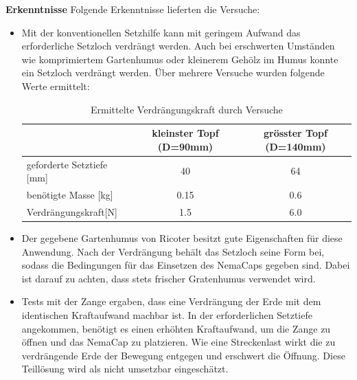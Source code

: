 \textbf{Erkenntnisse}
\newline
Folgende Erkenntnisse lieferten die Versuche:
\begin{itemize}
	\item Mit der konventionellen Setzhilfe kann mit geringem Aufwand das erforderliche Setzloch verdrängt werden. Auch bei erschwerten Umständen wie komprimiertem Gartenhumus oder kleinerem Gehölz im Humus konnte ein Setzloch verdrängt werden. Über mehrere Versuche wurden folgende Werte ermittelt:
\begin{table}[H]
	\begin{tabular}{|l|c|c|}
		\hline 
		& kleinster Topf (D=90mm) & grösster Topf (D=140mm) \\ 
		\hline 
		geforderte Setztiefe [mm] & 40 & 64 \\ 
		\hline 
		benötigte Masse [kg] & 0.15 & 0.6 \\ 
		\hline 
		Verdrängungskraft[N] & 1.5  & 6.0  \\ 
		\hline 
	\end{tabular} 
	\caption{Ermittelte Verdrängungskraft durch Versuche}
	\label{tab:verdraengungskraft}
\end{table}	
	
	\item Der gegebene Gartenhumus von Ricoter besitzt gute Eigenschaften für diese Anwendung. Nach der Verdrängung behält das Setzloch seine Form bei, sodass die Bedingungen für das Einsetzen des NemaCaps gegeben sind. Dabei ist darauf zu achten, dass stets frischer Gratenhumus verwendet wird.
	
	\item Tests mit der Zange ergaben, dass eine Verdrängung der Erde mit dem identischen Kraftaufwand machbar ist. In der erforderlichen Setztiefe angekommen, benötigt es einen erhöhten Kraftaufwand, um die Zange zu öffnen und das NemaCap zu platzieren. Wie eine Streckenlast wirkt die zu verdrängende Erde der Bewegung entgegen und erschwert die Öffnung. Diese Teillösung wird als nicht umsetzbar eingeschätzt.
\end{itemize} 

